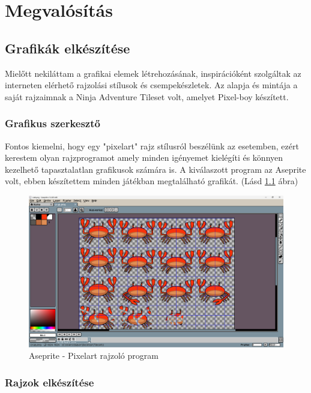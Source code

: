 \chapter{Megvalósítás}

\section{Grafikák elkészítése}

\indent \indent Mielőtt nekiláttam a grafikai elemek létrehozásának, inspirációként szolgáltak az interneten elérhető rajzolási stílusok és csempekészletek. Az alapja és mintája a saját rajzaimnak a Ninja Adventure Tileset volt, amelyet Pixel-boy készített.\cite{NAT}

\subsection{Grafikus szerkesztő}

\indent \indent Fontos kiemelni, hogy egy "pixelart" rajz stílusról beszélünk az esetemben, ezért kerestem olyan rajzprogramot amely minden igényemet kielégíti és könnyen kezelhető tapasztalatlan grafikusok számára is. A kiválaszott program az Aseprite volt, ebben készítettem minden játékban megtalálható grafikát. (Lásd \ref{fig:Aseprite} ábra)

\begin{figure}[H]
    \centering
    \includegraphics[width=14.0truecm]{images/Aseprite.png}
    \caption{Aseprite - Pixelart rajzoló program
    \cite{Aseprite}}

    \label{fig:Aseprite}
\end{figure}


\subsection{Rajzok elkészítése}

